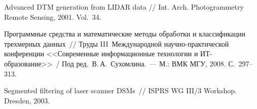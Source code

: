 \begin{multicols}{2}
{{\begin{thebibliography}{99}
Advanced DTM generation from \mbox{LIDAR} data // Int. Arch. Photogrammetry Remote Sensing, 2001. 
Vol.~34.

Программные средства и мате\-матические методы обработки и классификации трех\-мерных 
данных~// Труды III~Международной научно-прак\-ти\-че\-ской конференции 
<<Современные информационные технологии и ИТ-образование>>~/ Под ред.\ 
В.\,А.~Сухомлина.~--- М.: ВМК МГУ, 2008. С.~297--313.

\label{end\stat}

Segmented filtering of laser scanner DSMs~// ISPRS WG III/3 Workshop. Dresden, 2003.
 \end{thebibliography}
}
}
\end{multicols}